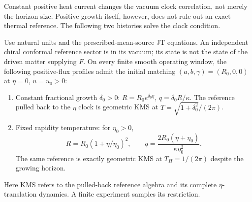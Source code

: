Constant positive heat current changes the vacuum clock correlation, not merely
the horizon size. Positive growth itself, however, does not rule out an exact
thermal reference. The following two histories solve the clock condition.

\begin{proposition}
\label{prop:running-kms}
Use natural units and the prescribed-mean-source JT equations. An independent
chiral conformal reference sector is in its vacuum; its state is not the state
of the driven matter supplying $F$. On every finite smooth operating window,
the following positive-flux profiles admit the initial matching
$(a,b,\gamma)=(R_0,0,0)$ at $\eta=0$, $u=u_0>0$:
\begin{enumerate}
\item Constant fractional growth $\delta_0>0$:
$R=R_0e^{\delta_0\eta}$, $q=\delta_0R/\kappa$. The reference pulled back
to the $\eta$ clock is geometric KMS at $T=\sqrt{1+\delta_0^2}/(2\pi)$.
\item Fixed rapidity temperature: for $\eta_0>0$,
\begin{equation}\label{eq:fixed-temperature-growth}
 R=R_0(1+\eta/\eta_0)^2,\qquad
 q=\frac{2R_0(\eta+\eta_0)}{\kappa\eta_0^2}.
\end{equation}
The same reference is exactly geometric KMS at $T_H=1/(2\pi)$ despite
the growing horizon.
\end{enumerate}
Here KMS refers to the pulled-back reference algebra and its complete
$\eta$-translation dynamics. A finite experiment samples its restriction.
\end{proposition}
